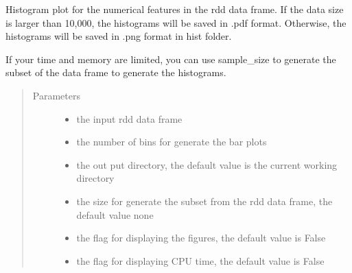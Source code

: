 \documentclass[letterpaper,12pt,english]{sphinxmanual}
\begin{document}
\begin{fulllineitems}
Histogram plot for the numerical features in the rdd data frame.  If the data size is larger than 10,000, the histograms will be saved in .pdf
format. Otherwise, the histograms will be saved in .png format in hist folder.

If your time and memory are limited, you can use sample\_size to generate the subset of the data
frame to generate the histograms.
\begin{quote}\begin{description}
\item[{Parameters}] \leavevmode\begin{itemize}
\item {} 
 \textendash{} the input rdd data frame

\item {} 
 \textendash{} the number of bins for generate the bar plots

\item {} 
 \textendash{} the out put directory, the default value is the current working directory

\item {} 
 \textendash{} the size for generate the subset from the rdd data frame, the
default value none

\item {} 
 \textendash{} the flag for displaying the figures, the default value is False

\item {} 
 \textendash{} the flag for displaying CPU time, the default value is False

\end{itemize}

\end{description}\end{quote}

\end{fulllineitems}
\end{document}
